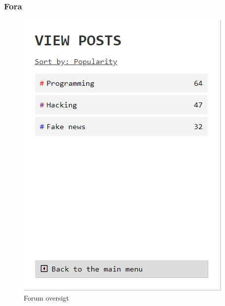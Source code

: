 \subsubsection{Fora}
\begin{table}[H]
    \begin{minipage}{.33\textwidth}
        \begin{figure}[H]
            \centering
            \includegraphics[width=0.95\linewidth]{Projectdoc/Assets/Illustrationer/forums.png}
            \caption{Forum oversigt}
            \label{fig:forum}
        \end{figure}
    \end{minipage}
    \begin{minipage}{.33\textwidth}
        \begin{figure}[H]
            \centering

\end{figure}
\end{minipage}
\end{table}
